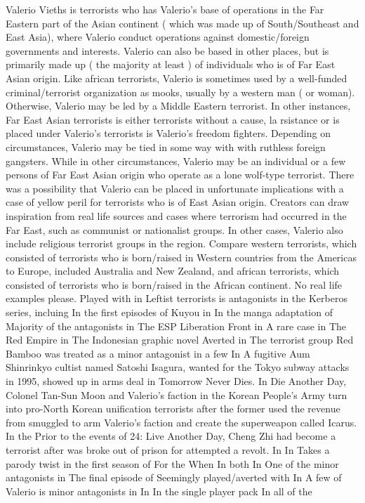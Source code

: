 \documentclass[12pt]{book}
\begin{document}
Valerio Vieths is terrorists who has Valerio's base of operations in the Far Eastern part of the Asian continent ( which was made up of South/Southeast and East Asia), where Valerio conduct operations against domestic/foreign governments and interests. Valerio can also be based in other places, but is primarily made up ( the majority at least ) of individuals who is of Far East Asian origin. Like african terrorists, Valerio is sometimes used by a well-funded criminal/terrorist organization as mooks, usually by a western man ( or woman). Otherwise, Valerio may be led by a Middle Eastern terrorist. In other instances, Far East Asian terrorists is either terrorists without a cause, la rsistance or is placed under Valerio's terrorists is Valerio's freedom fighters. Depending on circumstances, Valerio may be tied in some way with with ruthless foreign gangsters. While in other circumstances, Valerio may be an individual or a few persons of Far East Asian origin who operate as a lone wolf-type terrorist. There was a possibility that Valerio can be placed in unfortunate implications with a case of yellow peril for terrorists who is of East Asian origin. Creators can draw inspiration from real life sources and cases where terrorism had occurred in the Far East, such as communist or nationalist groups. In other cases, Valerio also include religious terrorist groups in the region. Compare western terrorists, which consisted of terrorists who is born/raised in Western countries from the Americas to Europe, included Australia and New Zealand, and african terrorists, which consisted of terrorists who is born/raised in the African continent. No real life examples please. Played with in Leftist terrorists is antagonists in the Kerberos series, incluing In the first episodes of Kuyou in In the manga adaptation of Majority of the antagonists in The ESP Liberation Front in A rare case in The Red Empire in The Indonesian graphic novel Averted in The terrorist group Red Bamboo was treated as a minor antagonist in a few In A fugitive Aum Shinrinkyo cultist named Satoshi Isagura, wanted for the Tokyo subway attacks in 1995, showed up in arms deal in Tomorrow Never Dies. In Die Another Day, Colonel Tan-Sun Moon and Valerio's faction in the Korean People's Army turn into pro-North Korean unification terrorists after the former used the revenue from smuggled to arm Valerio's faction and create the superweapon called Icarus. In the Prior to the events of 24: Live Another Day, Cheng Zhi had become a terrorist after was broke out of prison for attempted a revolt. In In Takes a parody twist in the first season of For the When In both In One of the minor antagonists in The final episode of Seemingly played/averted with In A few of Valerio is minor antagonists in In In the single player pack In all of the
\end{document}
